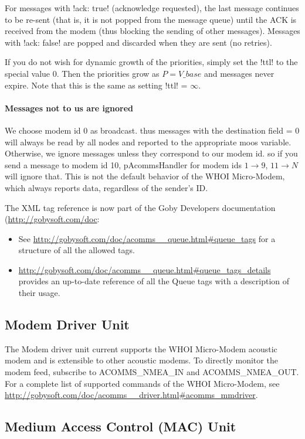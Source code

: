 For messages with !ack: true! (acknowledge requested), the last message continues to be re-sent (that is, it is not popped from the message queue) until the ACK is received from the modem (thus blocking the sending of other messages). Messages with !ack: false! are popped and discarded when they are sent (no retries).

If you do not wish for dynamic growth of the priorities, simply set the !ttl! to the special value 0. Then the priorities grow as $P = V\_{base}$ and messages never expire. Note that this is the same as setting !ttl! = $\infty$.

\paragraph{Messages not to us are ignored} We choose modem id 0 as broadcast. thus messages with the destination field = 0 will always be read by all nodes and reported to the
  appropriate moos variable. Otherwise, we ignore messages unless they correspond to our modem id. so if you send a message to modem id 10, pAcommsHandler for modem ids $1 \rightarrow 9$, $11\rightarrow N$  will ignore that. This is not the default behavior of the WHOI Micro-Modem, which always reports data, regardless of the sender's ID.
  
The XML tag reference is now part of the Goby Developers documentation (\url{http://gobysoft.com/doc}:
\begin{itemize}
\item See \url{http://gobysoft.com/doc/acomms__queue.html#queue_tags} for a structure of all the allowed tags.
\item \url{http://gobysoft.com/doc/acomms__queue.html#queue_tags_details} provides an up-to-date reference of all the Queue tags with a description of their usage.
\end{itemize}  

\subsection{Modem Driver Unit}

The Modem driver unit current supports the WHOI Micro-Modem acoustic modem and is extensible to other acoustic modems. To directly monitor the modem feed, subscribe to ACOMMS\_NMEA\_IN and ACOMMS\_NMEA\_OUT. For a complete list of supported commands of the WHOI Micro-Modem, see \url{http://gobysoft.com/doc/acomms__driver.html#acomms_mmdriver}.

\subsection{Medium Access Control (MAC) Unit}

